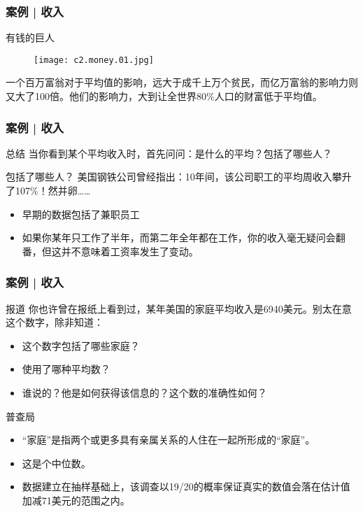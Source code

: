 \begin{frame}
  \frametitle{案例 | 收入}
  \begin{block}{有钱的巨人}
  \begin{figure}
    \centering
    \texttt{[image: c2.money.01.jpg]}
  \end{figure}
  一个百万富翁对于平均值的影响，远大于成千上万个贫民，而亿万富翁的影响力则又大了100倍。他们的影响力，大到让全世界80\%人口的财富低于平均值。
  \end{block}
\end{frame}

\begin{frame}
  \frametitle{案例 | 收入}
  \begin{block}{总结}
    当你看到某个平均收入时，首先问问：是什么的平均？包括了哪些人？
  \end{block}
  \pause
  \begin{block}{包括了哪些人？}
    美国钢铁公司曾经指出：10年间，该公司职工的平均周收入攀升了107\%！然并卵……
    \begin{itemize}
      \item 早期的数据包括了兼职员工
      \item 如果你某年只工作了半年，而第二年全年都在工作，你的收入毫无疑问会翻番，但这并不意味着工资率发生了变动。
    \end{itemize}
  \end{block}
\end{frame}

\begin{frame}
  \frametitle{案例 | 收入}
  \begin{block}{报道}
    你也许曾在报纸上看到过，某年美国的家庭平均收入是6940美元。别太在意这个数字，除非知道：
    \begin{itemize}
      \item 这个数字包括了哪些家庭？
      \item 使用了哪种平均数？
      \item 谁说的？他是如何获得该信息的？这个数的准确性如何？
    \end{itemize}
  \end{block}
  \pause
  \begin{block}{普查局}
    \begin{itemize}
      \item “家庭”是指两个或更多具有亲属关系的人住在一起所形成的“家庭”。
      \item 这是个中位数。
      \item 数据建立在抽样基础上，该调查以19/20的概率保证真实的数值会落在估计值加减71美元的范围之内。
    \end{itemize}
  \end{block}
\end{frame}

